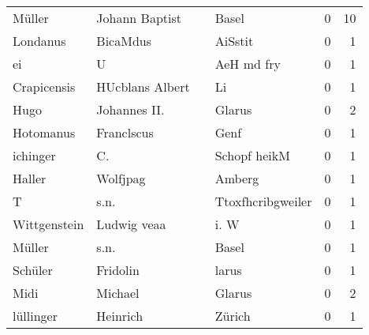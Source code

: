 \begin{center}
\begin{tiny}
\begin{longtabu}{llllrr}
                   Müller &                     Johann Baptist &             &                                       Basel &          0 &        10 \\
                 Londanus &                           BicaMdus &             &                                     AiSstit &          0 &         1 \\
                       ei &                                  U &             &                                  AeH md fry &          0 &         1 \\
              Crapicensis &                    HUcblans Albert &             &                                          Li &          0 &         1 \\
                     Hugo &                       Johannes II. &             &                                      Glarus &          0 &         2 \\
                Hotomanus &                         Franclscus &             &                                        Genf &          0 &         1 \\
                 ichinger &                                 C. &             &                                Schopf heikM &          0 &         1 \\
                   Haller &                           Wolfjpag &             &                                      Amberg &          0 &         1 \\
                        T &                               s.n. &             &                           Ttoxfhcribgweiler &          0 &         1 \\
             Wittgenstein &                        Ludwig veaa &             &                                        i. W &          0 &         1 \\
                   Müller &                               s.n. &             &                                       Basel &          0 &         1 \\
                  Schüler &                           Fridolin &             &                                       larus &          0 &         1 \\
                     Midi &                            Michael &             &                                      Glarus &          0 &         2 \\
                lüllinger &                           Heinrich &             &                                      Zürich &          0 &         1 \\

\end{longtabu}
\end{tiny}
\end{center}
